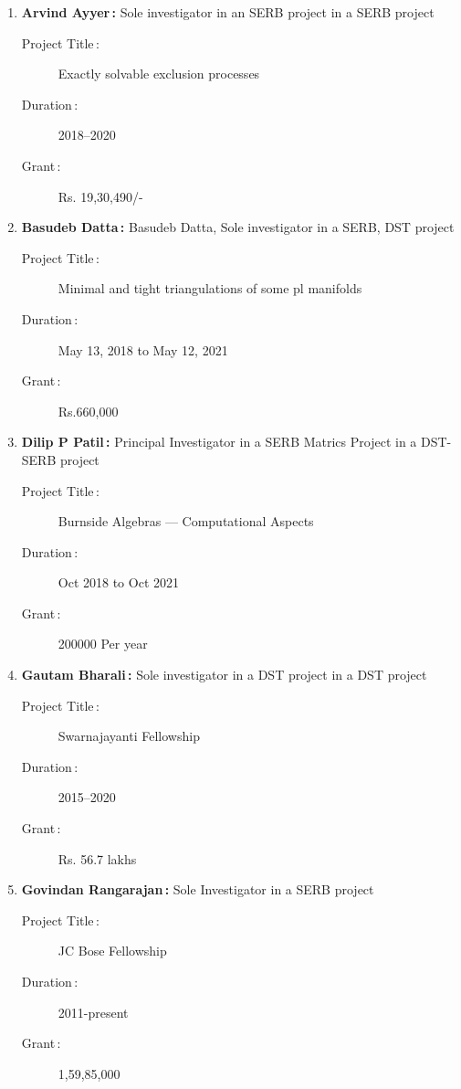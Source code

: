 \begin{enumerate}
\item {\bf Arvind Ayyer\,:} Sole investigator in an SERB project in a SERB project
\begin{description}
  \item[Project Title\,:]  Exactly solvable exclusion processes
  \item[Duration\,:] 2018--2020
  \item[Grant\,:] Rs. 19,30,490/-
\end{description}


\item {\bf Basudeb Datta\,:} Basudeb Datta, Sole investigator in a SERB, DST project
\begin{description}
  \item[Project Title\,:] Minimal and tight triangulations of some pl manifolds
  \item[Duration\,:] May 13, 2018 to May 12, 2021
  \item[Grant\,:] Rs.660,000
\end{description}


\item {\bf Dilip P Patil\,:} Principal Investigator in a SERB Matrics Project in a DST-SERB project
\begin{description}
  \item[Project Title\,:] Burnside Algebras --- Computational Aspects
  \item[Duration\,:] Oct 2018 to Oct 2021
  \item[Grant\,:] 200000 Per year
\end{description}


\item {\bf Gautam Bharali\,:} Sole investigator in a DST project in a DST project
\begin{description}
  \item[Project Title\,:] Swarnajayanti Fellowship
  \item[Duration\,:] 2015--2020
  \item[Grant\,:] Rs. 56.7 lakhs
\end{description}


\item {\bf Govindan Rangarajan\,:} Sole Investigator in a SERB project
\begin{description}
  \item[Project Title\,:] JC Bose Fellowship
  \item[Duration\,:] 2011-present
  \item[Grant\,:] 1,59,85,000
\end{description}



\end{enumerate}
